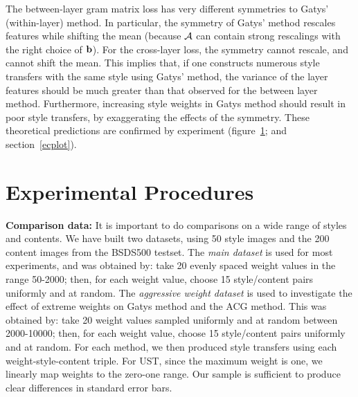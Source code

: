\documentclass[runningheads]{llncs}
\newcommand{\vect}[1]{{\bf {#1}}}
\newcommand{\matx}[1]{{\cal {#1}}}
\begin{document}
 The between-layer gram matrix loss has very different symmetries to Gatys'
(within-layer) method.  In particular, the symmetry of Gatys' method rescales
features while shifting the mean (because $\matx{A}$ can contain
strong rescalings with the right choice of $\vect{b}$).   For the
cross-layer loss, the symmetry cannot rescale, and cannot shift the
mean.   This implies that, if one constructs numerous style
transfers with the same style using Gatys' method, the variance of the layer features should be much greater than that
observed for the between layer method.  Furthermore, increasing style weights in Gatys method should result in poor
style transfers, by exaggerating the effects of the symmetry.  These theoretical predictions are confirmed by experiment (figure~\ref{}; and
section~\ref{ecplot}).








\section{Experimental Procedures}

{\bf Comparison data:}  It is important to do comparisons on a wide range of styles and contents.  We have built
two datasets, using 50 style images and the 200 content  images from the BSDS500  testset.   The {\em main dataset} is
used for most experiments, and was obtained by:  take 20 evenly spaced weight values in the range 50-2000; then, for
each weight value, choose 15 style/content pairs uniformly and at random.  The {\em aggressive weight dataset} is used
to investigate the effect of extreme weights on Gatys method and the ACG method.  This was obtained by:  take 20 weight
values sampled uniformly and at random between 2000-10000; then, for each weight value, choose 15 style/content
pairs uniformly and at random.   For each method, we then produced style transfers using each weight-style-content
triple.  For UST, since the maximum weight is one, we linearly map weights to the zero-one range.
Our sample is sufficient to produce clear differences in standard error bars.  
\end{document}
